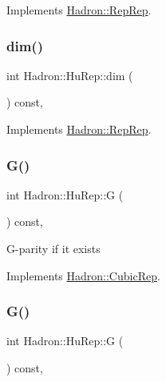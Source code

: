 Implements \mbox{\hyperlink{structHadron_1_1RepRep_a92c8802e5ed7afd7da43ccfd5b7cd92b}{Hadron\+::\+Rep\+Rep}}.

\mbox{\label{structHadron_1_1HuRep_aa222968e65bfc228eb9acf15a7df0388}} 
\subsubsection{\texorpdfstring{dim()}{dim()}\hspace{0.1cm}{\footnotesize\ttfamily [5/5]}}
{\footnotesize\ttfamily int Hadron\+::\+Hu\+Rep\+::dim (\begin{DoxyParamCaption}{ }\end{DoxyParamCaption}) const\hspace{0.3cm}{\ttfamily [inline]}, {\ttfamily [virtual]}}



Implements \mbox{\hyperlink{structHadron_1_1RepRep_a92c8802e5ed7afd7da43ccfd5b7cd92b}{Hadron\+::\+Rep\+Rep}}.

\mbox{\label{structHadron_1_1HuRep_a6486cf33fe424a2226d6fbb2dd7b7d3c}} 
\subsubsection{\texorpdfstring{G()}{G()}\hspace{0.1cm}{\footnotesize\ttfamily [1/3]}}
{\footnotesize\ttfamily int Hadron\+::\+Hu\+Rep\+::G (\begin{DoxyParamCaption}{ }\end{DoxyParamCaption}) const\hspace{0.3cm}{\ttfamily [inline]}, {\ttfamily [virtual]}}

G-\/parity if it exists 

Implements \mbox{\hyperlink{structHadron_1_1CubicRep_a52104e43266d1614c00bbd1c3b395458}{Hadron\+::\+Cubic\+Rep}}.

\mbox{\label{structHadron_1_1HuRep_a6486cf33fe424a2226d6fbb2dd7b7d3c}} 
\subsubsection{\texorpdfstring{G()}{G()}\hspace{0.1cm}{\footnotesize\ttfamily [2/3]}}
{\footnotesize\ttfamily int Hadron\+::\+Hu\+Rep\+::G (\begin{DoxyParamCaption}{ }\end{DoxyParamCaption}) const\hspace{0.3cm}{\ttfamily [inline]}, {\ttfamily [virtual]}}

